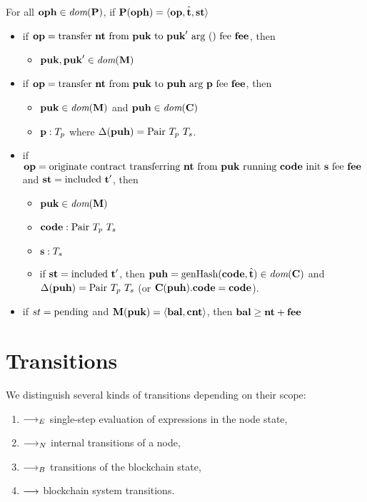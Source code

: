 \documentclass[a4paper]{llncs}
\begin{document}
For all $\OPH\in\DOM (\PENDING)$,
if  $\PENDING (\OPH) =  \Angle{\OP, \hat\TIME, \STATUS}$
\begin{itemize}
\item if $\OP = \TRANSFER\NTEZ\PUK{\PUK'}\MTEZ$, then
\begin{itemize}
  \item
  $\PUK, \PUK' \in \DOM (\MANAGERS)$
\end{itemize}
\item if $\OP = \TRANSFER[\PARAMETER]\NTEZ\PUK\PUH\MTEZ$, then
  \begin{itemize}
  \item $\PUK \in \DOM (\MANAGERS)$ and $\PUH\in\DOM (\CONTRACTORS)$
  \item $\PARAMETER : \TYPE_p$ where $\Delta (\PUH)  =\TPAIR\ \TYPE_p\ \TYPE_s$. 
  \end{itemize}
  
\item if $\OP = \ORIGINATE\NTEZ\PUK\CODE\STRING\MTEZ$ and $\STATUS =
  \STATUSINCLUDED\ \TIME'$, then
   \begin{itemize}
   \item $\PUK \in \DOM (\MANAGERS)$
  \item $\CODE : \TPAIR\ \TYPE_p\ \TYPE_s$
  \item $\STRING : \TYPE_s$
  \item if $\STATUS =
  \STATUSINCLUDED\ \TIME'$, then $\PUH =\GENERATEHASH (\CODE, \hat\TIME) \in \DOM (\CONTRACTORS)$ and $\Delta (\PUH)  =\TPAIR\ \TYPE_p\ \TYPE_s$ (or $\CONTRACTORS(\PUH).\CODE = \CODE$).

  \end{itemize}
  
 \item if $st = \STATUSPENDING$ and $\MANAGERS(\PUK) = \Angle{\BAL,
     \COU}$, then $\BAL \ge \NTEZ +  \MTEZ$ 
\end{itemize}

\section{Transitions}
\label{sec:transitions}

We distinguish several kinds of transitions depending on their scope:
\begin{enumerate}
\item $\ExprTrans$ single-step evaluation of expressions in the node state,
\item $\NodeTrans$ internal transitions of a node,
\item $\BlockTrans$ transitions of the blockchain state,
\item $\SystemTrans$ blockchain system transitions.
\end{enumerate}
\end{document}
